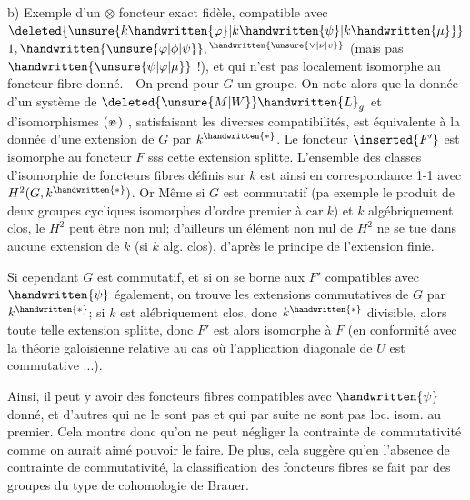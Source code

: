 
b) Exemple d'un $\otimes$ foncteur exact fidèle, compatible avec $\deleted{\unsure{k\handwritten{\varphi}|k\handwritten{\psi}|k\handwritten{\mu}}}$ $1,\handwritten{\unsure{\varphi|\phi|\psi}},{}^{\handwritten{\unsure{\vee|\nu|v}}}$ (mais pas  $\handwritten{\unsure{\psi|\varphi|\mu}}$ !), et qui n'est pas localement isomorphe au foncteur fibre donné. - On prend pour $G$ un groupe. On note alors que la donnée d'un système de $\deleted{\unsure{M|W}}\handwritten{L}_{g}$ et d'isomorphismes $(\rlap{\(x\)}-)$ , satisfaisant les diverses compatibilités, est équivalente à la donnée d'une extension de $G$ par $k^{\handwritten{*}}$. Le foncteur $\inserted{F'}$ est isomorphe au foncteur $F$ sss cette extension splitte. L'ensemble des classes d'isomorphie de foncteurs fibres définis sur $k$ est ainsi en correspondance 1-1 avec $H^{2}(G,k^{\handwritten{*}})$. Or Même si $G$ est commutatif (pa exemple le produit de deux groupes cycliques isomorphes d'ordre premier à  $\mathrm{car}.k$) et $k$ algébriquement clos, le $H^{2}$ peut être non nul;  d'ailleurs un élément non nul de $H^{2}$ ne se tue dans aucune extension de $k$ (si $k$ alg. clos), d'après le principe de l'extension finie.

Si cependant $G$ est commutatif, et si on se borne aux $F'$ compatibles avec $\handwritten{\psi}$ également, on trouve les extensions commutatives de $G$ par $k^{\handwritten{*}}$; si $k$ est alébriquement clos, donc $k^{\handwritten{*}}$ divisible, alors toute telle extension splitte, donc $F'$ est alors isomorphe à $F$ (en conformité avec la théorie galoisienne relative au cas où l'application diagonale de $U$ est commutative ...).

Ainsi, il peut y avoir des foncteurs fibres compatibles avec $\handwritten{\psi}$ donné, et d'autres qui ne le sont pas et qui par suite ne sont pas loc. isom. au premier. Cela montre donc  qu'on ne peut négliger la  contrainte de commutativité comme on aurait aimé pouvoir le faire. De plus,  cela suggère qu'en l'absence de contrainte de commutativité, la classification des foncteurs fibres se fait par des groupes du type de cohomologie de Brauer.

